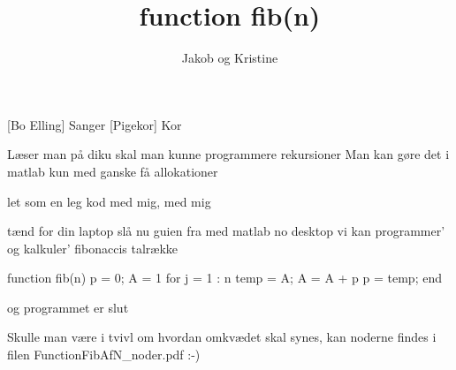 \documentclass[a4paper,11pt]{article}
\title{function fib(n)}
\author{Jakob og Kristine}
\begin{document}
\maketitle

\begin{roles}  
[Bo Elling] Sanger
[Pigekor] Kor
\end{roles}

\begin{song}
   Læser man på diku skal man kunne programmere rekursioner
Man kan gøre det i matlab kun med ganske få allokationer

   let som en leg
kod med mig, med mig

   tænd for din laptop
slå nu guien fra med matlab no desktop
vi kan programmer'
og kalkuler'
fibonaccis talrække

  function fib(n)
  p = 0;
  A = 1
  for j = 1 : n
    temp = A;
    A = A + p
    p = temp;
  end
 
 og programmet er slut
  
  Skulle man være i tvivl om hvordan omkvædet skal synes, kan noderne findes i filen FunctionFibAfN\_noder.pdf :-)
\end{song}
\end{document}
